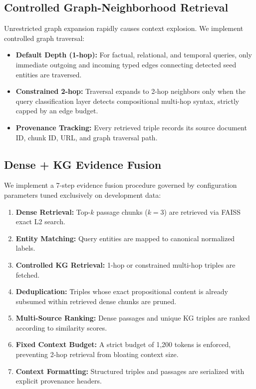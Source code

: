 \documentclass[conference]{IEEEtran}
\begin{document}
\subsection{Controlled Graph-Neighborhood Retrieval}
Unrestricted graph expansion rapidly causes context explosion. We implement controlled graph traversal:
\begin{itemize}
    \item \textbf{Default Depth (1-hop):} For factual, relational, and temporal queries, only immediate outgoing and incoming typed edges connecting detected seed entities are traversed.
    \item \textbf{Constrained 2-hop:} Traversal expands to 2-hop neighbors only when the query classification layer detects compositional multi-hop syntax, strictly capped by an edge budget.
    \item \textbf{Provenance Tracking:} Every retrieved triple records its source document ID, chunk ID, URL, and graph traversal path.
\end{itemize}

\subsection{Dense + KG Evidence Fusion}
We implement a 7-step evidence fusion procedure governed by configuration parameters tuned exclusively on development data:
\begin{enumerate}
    \item \textbf{Dense Retrieval:} Top-$k$ passage chunks ($k=3$) are retrieved via FAISS exact L2 search.
    \item \textbf{Entity Matching:} Query entities are mapped to canonical normalized labels.
    \item \textbf{Controlled KG Retrieval:} 1-hop or constrained multi-hop triples are fetched.
    \item \textbf{Deduplication:} Triples whose exact propositional content is already subsumed within retrieved dense chunks are pruned.
    \item \textbf{Multi-Source Ranking:} Dense passages and unique KG triples are ranked according to similarity scores.
    \item \textbf{Fixed Context Budget:} A strict budget of 1,200 tokens is enforced, preventing 2-hop retrieval from bloating context size.
    \item \textbf{Context Formatting:} Structured triples and passages are serialized with explicit provenance headers.
\end{enumerate}
\end{document}
